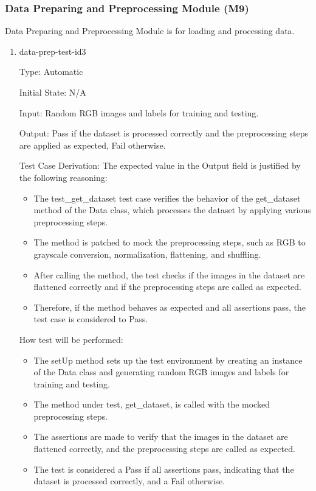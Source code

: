 \documentclass[12pt, titlepage]{article}
\begin{document}
\subsubsection{Data Preparing and Preprocessing Module (M9)}
Data Preparing and Preprocessing Module is for loading and processing data.

\begin{enumerate}

  \item{data-prep-test-id3\\}
  
  Type: Automatic
            
  Initial State: N/A
            
  Input: Random RGB images and labels for training and testing.
            
  Output: Pass if the dataset is processed correctly and the preprocessing steps 
          are applied as expected, Fail otherwise.
  
  Test Case Derivation: The expected value in the Output field is justified by 
  the following reasoning:
  \begin{itemize}
    \item The test\_get\_dataset test case verifies the behavior of the 
    get\_dataset method of the Data class, which processes the dataset 
    by applying various preprocessing steps.
    \item The method is patched to mock the preprocessing steps, such as 
    RGB to grayscale conversion, normalization, flattening, and shuffling.
    \item After calling the method, the test checks if the images in the 
    dataset are flattened correctly and if the preprocessing steps are called as expected.
    \item Therefore, if the method behaves as expected and all assertions 
    pass, the test case is considered to Pass.
  \end{itemize}
  
  
  How test will be performed: 
  \begin{itemize}
    \item The setUp method sets up the test environment by creating an 
    instance of the Data class and generating random RGB images and 
    labels for training and testing.
    \item The method under test, get\_dataset, is called with the 
    mocked preprocessing steps.
    \item The assertions are made to verify that the images in the 
    dataset are flattened correctly, and the preprocessing steps are 
    called as expected.
    \item The test is considered a Pass if all assertions pass, 
    indicating that the dataset is processed correctly, and a Fail otherwise.
  \end{itemize}

\end{enumerate}
\end{document}
